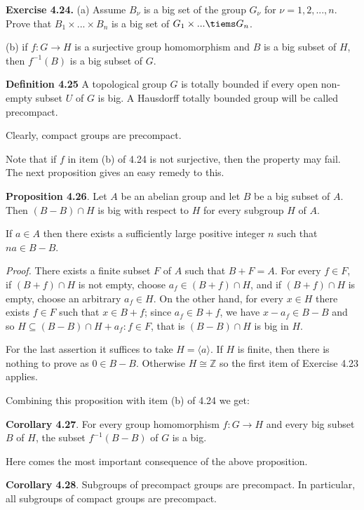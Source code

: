 \documentclass[12pt]{article}
\begin{document}
\textbf{Exercise 4.24.} (a) Assume $B_\nu$ is a big set of the group $G_\nu$ for $\nu = 1, 2, . . . , n$. Prove that $B_1 \times . . . \times B_n$ is
a big set of $G_1 \times . . . \tiems G_n$.


    (b) if $f : G \to H$ is a surjective group homomorphism and $B$ is a big subset of $H$, then $f^{-1}(B)$ is a big subset
    of $G$.


\textbf{Definition 4.25} A topological group $G$ is totally bounded if every open non-empty subset $U$ of $G$ is big. A
Hausdorff totally bounded group will be called precompact.


    Clearly, compact groups are precompact.


    Note that if $f$ in item (b) of 4.24 is not surjective, then the property may fail. The next proposition gives
an easy remedy to this.


\textbf{Proposition 4.26}. Let $A$ be an abelian group and let $B$ be a big subset of $A$. Then $(B - B) \cap H$ is big with
respect to $H$ for every subgroup $H$ of $A$.


    If $a \in A$ then there exists a sufficiently large positive integer $n$ such that $na \in B - B$.


    \emph{Proof.} There exists a finite subset $F$ of $A$ such that $B + F = A$. For every $f \in F$, if $(B + f) \cap H$ is not empty,
choose $a_f \in (B + f) \cap H$, and if $(B + f) \cap H$ is empty, choose an arbitrary $a_f \in H$. On the other hand, for
every $x \in H$ there exists $f \in F$ such that $x \in B + f$; since $a_f \in B + f$, we have $x - a_f \in B - B$ and so
$H \subseteq (B - B) \cap H + {a_f : f \in F}$, that is $(B - B) \cap H$ is big in $H$.


    For the last assertion it suffices to take $H = \langle a \rangle$. If $H$ is finite, then there is nothing to prove as $0 \in B - B$.
Otherwise $H \cong \mathbb{Z}$ so the first item of Exercise 4.23 applies.


Combining this proposition with item (b) of 4.24 we get:


\textbf{Corollary 4.27}. For every group homomorphism $f : G \to H$ and every big subset $B$ of $H$, the subset $f^{-1}(B-B)$
of $G$ is a big.


    Here comes the most important consequence of the above proposition.


\textbf{Corollary 4.28}. Subgroups of precompact groups are precompact. In particular, all subgroups of compact groups
are precompact.
\end{document}
